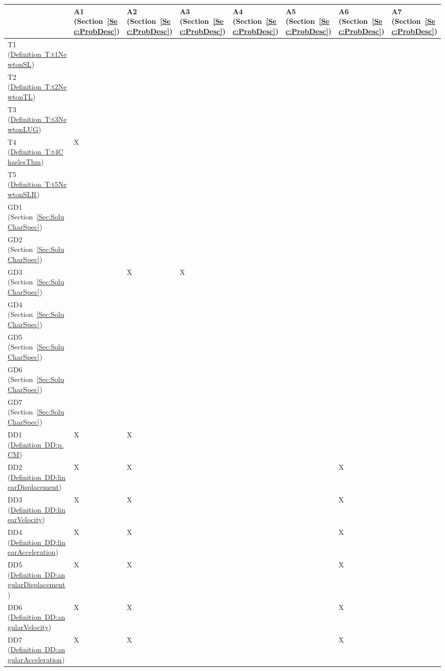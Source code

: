 \documentclass[12pt]{article}
\begin{document}
\begin{longtable}{l l l l l l l l}
\toprule
 & A1 (Section~\ref{Sec:ProbDesc}) & A2 (Section~\ref{Sec:ProbDesc}) & A3 (Section~\ref{Sec:ProbDesc}) & A4 (Section~\ref{Sec:ProbDesc}) & A5 (Section~\ref{Sec:ProbDesc}) & A6 (Section~\ref{Sec:ProbDesc}) & A7 (Section~\ref{Sec:ProbDesc})
\\
\midrule
T1 (\hyperref[T:t1NewtonSL]{Definition~T:t1NewtonSL}) &  &  &  &  &  &  & 
\\
T2 (\hyperref[T:t2NewtonTL]{Definition~T:t2NewtonTL}) &  &  &  &  &  &  & 
\\
T3 (\hyperref[T:t3NewtonLUG]{Definition~T:t3NewtonLUG}) &  &  &  &  &  &  & 
\\
T4 (\hyperref[T:t4ChaslesThm]{Definition~T:t4ChaslesThm}) & X &  &  &  &  &  & 
\\
T5 (\hyperref[T:t5NewtonSLR]{Definition~T:t5NewtonSLR}) &  &  &  &  &  &  & 
\\
GD1 (Section~\ref{Sec:SoluCharSpec}) &  &  &  &  &  &  & 
\\
GD2 (Section~\ref{Sec:SoluCharSpec}) &  &  &  &  &  &  & 
\\
GD3 (Section~\ref{Sec:SoluCharSpec}) &  & X & X &  &  &  & 
\\
GD4 (Section~\ref{Sec:SoluCharSpec}) &  &  &  &  &  &  & 
\\
GD5 (Section~\ref{Sec:SoluCharSpec}) &  &  &  &  &  &  & 
\\
GD6 (Section~\ref{Sec:SoluCharSpec}) &  &  &  &  &  &  & 
\\
GD7 (Section~\ref{Sec:SoluCharSpec}) &  &  &  &  &  &  & 
\\
DD1 (\hyperref[DD:p.CM]{Definition~DD:p.CM}) & X & X &  &  &  &  & 
\\
DD2 (\hyperref[DD:linearDisplacement]{Definition~DD:linearDisplacement}) & X & X &  &  &  & X & 
\\
DD3 (\hyperref[DD:linearVelocity]{Definition~DD:linearVelocity}) & X & X &  &  &  & X & 
\\
DD4 (\hyperref[DD:linearAcceleration]{Definition~DD:linearAcceleration}) & X & X &  &  &  & X & 
\\
DD5 (\hyperref[DD:angularDisplacement]{Definition~DD:angularDisplacement}) & X & X &  &  &  & X & 
\\
DD6 (\hyperref[DD:angularVelocity]{Definition~DD:angularVelocity}) & X & X &  &  &  & X & 
\\
DD7 (\hyperref[DD:angularAcceleration]{Definition~DD:angularAcceleration}) & X & X &  &  &  & X & 
\\

\end{longtable}
\end{document}
